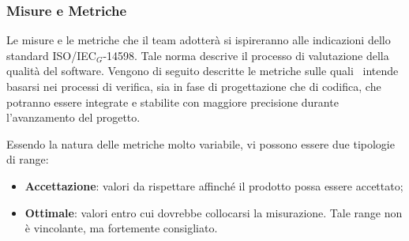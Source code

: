 \subsubsection{Misure e Metriche}
Le misure e le metriche che il team adotterà si ispireranno alle indicazioni dello standard ISO/IEC$_G$-14598. Tale norma descrive il processo di valutazione della qualità del software. Vengono di seguito descritte le metriche sulle quali \gruppo\ intende basarsi nei processi di verifica, sia in fase di progettazione che di codifica, che potranno essere integrate e stabilite con maggiore precisione durante l'avanzamento del progetto.

Essendo la natura delle metriche molto variabile, vi possono essere due tipologie di range:

\begin{itemize}
\item \textbf{Accettazione}: valori da rispettare affinché il prodotto possa essere accettato;
\item \textbf{Ottimale}: valori entro cui dovrebbe collocarsi la misurazione. Tale range non è vincolante, ma fortemente consigliato.
\end{itemize}

